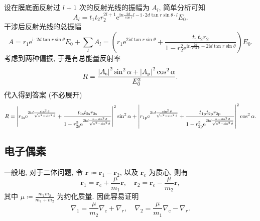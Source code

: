 \documentclass{article}
\begin{document}
设在膜底面反射过 $l+1$ 次的反射光线的振幅为 $A_l$, 简单分析可知
\begin{equation}
	A_l=t_1t_2r_2^{2l+1}\mathrm e^{\mathrm in\frac{2d}{\cos r}l-\mathrm i\cdot2d\tan r\sin\theta\cdot l}E_0.
\end{equation}
干涉后反射光线的总振幅
\begin{equation}
	A=r_1\mathrm e^{\mathrm i\cdot2d\tan r\sin\theta}E_0+\sum_lA_l
	=\left(r_1\mathrm e^{2\mathrm id\tan r\sin\theta}+\frac{t_1t_2r_2}{1-r_2^2\mathrm e^{\mathrm in\frac{2d}{\cos r}-2\mathrm id\tan r\sin\theta}}\right)E_0.
\end{equation}
考虑到两种偏振, 于是有总能量反射率
\begin{equation}
	R=\frac{\left|A_\text s\right|^2\sin^2\alpha+\left|A_\text p\right|^2\cos^2\alpha}{E_0^2}.
\end{equation}
代入得到答案 (不必展开)
\begin{equation}
	R=
	\left|r_{1\text s}\mathrm e^{2\mathrm id\frac{\sin^2\theta}{\sqrt{n^2-\sin^2\theta}}}+\frac{t_{1\text s}t_{2\text s}r_{2\text s}}{1-r_{2\text s}^2\mathrm e^{2\mathrm id\frac{n-\sin^2\theta}{\sqrt{n^2-\sin^2\theta}}}}\right|^2\sin^2\alpha+
	\left|r_{1\text p}\mathrm e^{2\mathrm id\frac{\sin^2\theta}{\sqrt{n^2-\sin^2\theta}}}+\frac{t_{1\text p}t_{2\text p}r_{2\text p}}{1-r_{2\text p}^2\mathrm e^{2\mathrm id\frac{n-\sin^2\theta}{\sqrt{n^2-\sin^2\theta}}}}\right|^2\cos^2\alpha.
\end{equation}

\subsection{电子偶素}

一般地, 对于二体问题, 令 $\mathbf r\coloneqq\mathbf r_1-\mathbf r_2$, 以及 $\mathbf r_\mathrm c$ 为质心, 则有
\begin{equation}
	\mathbf r_1=\mathbf r_\mathrm c+\frac\mu{m_1}\mathbf r,\quad
	\mathbf r_2=\mathbf r_{\mathrm c}-\frac{\mu}{m_2}\mathbf r,
\end{equation}
其中 $\mu\coloneqq\frac{m_1m_2}{m_1+m_2}$ 为约化质量.
因此容易证明
\begin{equation}
	\label{eq:梯度}
	\nabla_1=\frac{\mu}{m_2}\nabla_\mathrm c+\nabla_r,\quad
	\nabla_2=\frac{\mu}{m_1}\nabla_{\mathrm c}-\nabla_r.
\end{equation}
\end{document}

